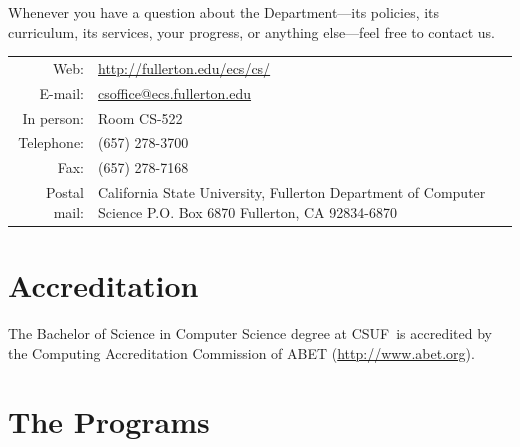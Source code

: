 \documentclass{book}
\newcommand{\CampusName}{CSUF}
\begin{document}
Whenever you have a question about the Department---its policies, its curriculum, its services, your progress, or anything else---feel free to contact us.

\begin{tabular}{r p{6in}} %
  Web: & \url{http://fullerton.edu/ecs/cs/} \\ \index{website}
  E-mail: & \href{mailto:csoffice@ecs.fullerton.edu}{\url{csoffice@ecs.fullerton.edu}} \\ \index{e-mail}
  In person: & Room CS-522 \\ \index{department office}
  Telephone: & (657) 278-3700 \\ \index{phone number} \index{telephone number}
  Fax: & (657) 278-7168 \\ \index{fax number}
  Postal mail: & California State University, Fullerton \newline\index{postal address}\index{address}Department of Computer Science \newline
P.O. Box 6870 \newline
Fullerton, CA 92834-6870
\end{tabular}

\section{Accreditation} 

The Bachelor of Science in Computer Science degree at \CampusName~is accredited by the Computing Accreditation Commission of ABET (\url{http://www.abet.org}).

\begin{center}
\end{center}

\section{The Programs}
\end{document}
